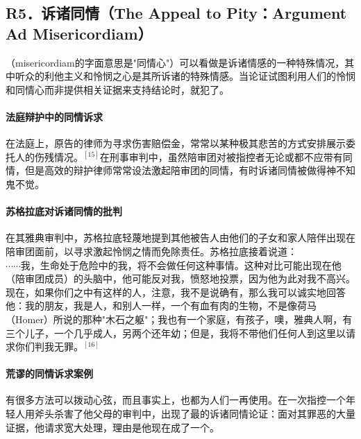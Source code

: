 \subsection{R5．诉诸同情（The Appeal to Pity：Argument Ad Misericordiam）}

\begin{theorembox}[title=诉诸同情谬误的定义]
（misericordiam的字面意思是"同情心"）可以看做是诉诸情感的一种特殊情况，其中听众的利他主义和怜悯之心是其所诉诸的特殊情感。当论证试图利用人们的怜悯和同情心而非提供相关证据来支持结论时，就犯了。
\end{theorembox}

\paragraph{法庭辩护中的同情诉求}
\begin{examplebox}[title=法庭中的同情诉求]
在法庭上，原告的律师为寻求伤害赔偿金，常常以某种极其悲苦的方式安排展示委托人的伤残情况。${ }^{[15]}$在刑事审判中，虽然陪审团对被指控者无论或都不应带有同情，但是高效的辩护律师常常设法激起陪审团的同情，有时诉诸同情被做得神不知鬼不觉。
\end{examplebox}

\paragraph{苏格拉底对诉诸同情的批判}
在其雅典审判中，苏格拉底轻蔑地提到其他被告人由他们的子女和家人陪伴出现在陪审团面前，以寻求激起怜悯之情而免除责任。苏格拉底接着说道：\\
$\cdots \cdots$我，生命处于危险中的我，将不会做任何这种事情。这种对比可能出现在他（陪审团成员）的头脑中，他可能反对我，愤怒地投票，因为他为此对我不高兴。现在，如果你们之中有这样的人，注意，我不是说确有，那么我可以诚实地回答他：我的朋友，我是人，和别人一样，一个有血有肉的生物，不是像荷马（Homer）所说的那种"木石之躯"；我也有一个家庭，有孩子，噢，雅典人啊，有三个儿子，一个几乎成人，另两个还年幼；但是，我将不带他们任何人到这里以请求你们判我无罪。${ }^{[16]}$

\paragraph{荒谬的同情诉求案例}
\begin{examplebox}[title=荒谬的同情诉求案例]
有很多方法可以拨动心弦，而且事实上，也都为人们一再使用。在一次指控一个年轻人用斧头杀害了他父母的审判中，出现了最的诉诸同情论证：面对其罪恶的大量证据，他请求宽大处理，理由是他现在成了一个。
\end{examplebox}